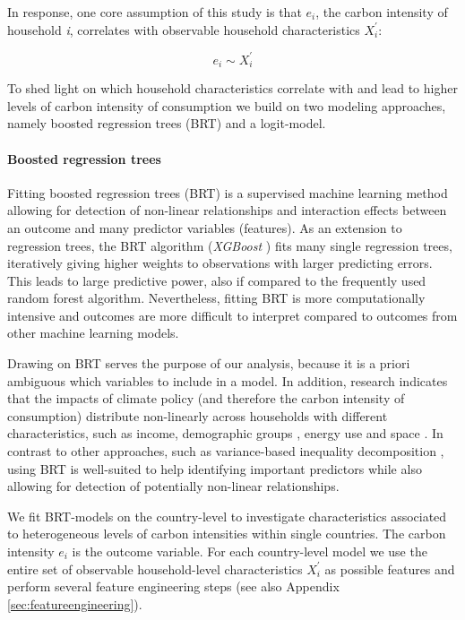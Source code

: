 \documentclass[12pt, a4paper]{article}
\begin{document}
In response, one core assumption of this study is that $e_{i}$, the carbon intensity of household \textit{i}, correlates with observable household characteristics $X_{i}^{'}$:

\begin{equation}
    e_{i} \sim X_{i}^{'}
\end{equation}


To shed light on which household characteristics correlate with and lead to higher levels of carbon intensity of consumption we build on two modeling approaches, namely boosted regression trees (BRT) and a logit-model.

\paragraph{Boosted regression trees} Fitting boosted regression trees (BRT) \autocite{Friedman.2003, Elith.2008} is a supervised machine learning method allowing for detection of non-linear relationships and interaction effects between an outcome and many predictor variables (features). As an extension to regression trees, the BRT algorithm (\textit{XGBoost} \autocite{Chen.2016}) fits many single regression trees, iteratively giving higher weights to observations with larger predicting errors. This leads to large predictive power, also if compared to the frequently used random forest algorithm. Nevertheless, fitting BRT is more computationally intensive and outcomes are more difficult to interpret compared to outcomes from other machine learning models. %

Drawing on BRT serves the purpose of our analysis, because it is a priori ambiguous which variables to include in a model. In addition, research indicates that the impacts of climate policy (and therefore the carbon intensity of consumption) distribute non-linearly across households with different characteristics, such as income, demographic groups \autocite{Missbach.2023}, energy use \autocite{Farrell.2017} and space \autocite{Chan.2023}. In contrast to other approaches, such as variance-based inequality decomposition \autocite{Farrell.2017,Sager.2019b,Missbach.2023b}, using BRT is well-suited to help identifying important predictors while also allowing for detection of potentially non-linear relationships.

We fit BRT-models on the country-level to investigate characteristics associated to heterogeneous levels of carbon intensities within single countries. The carbon intensity $e_{i}$ is the outcome variable. For each country-level model we use the entire set of observable household-level characteristics $X_{i}^{'}$ as possible features and perform several feature engineering steps (see also Appendix \ref{sec:featureengineering}).
\end{document}
